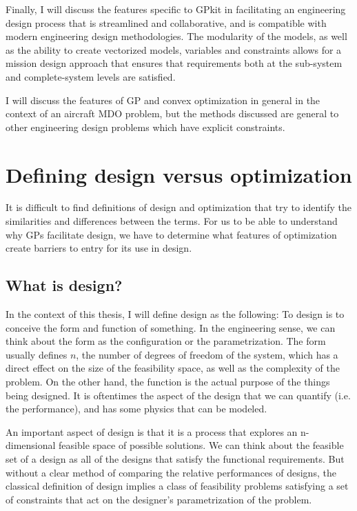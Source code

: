 Finally, I will discuss the features specific to GPkit in facilitating
an engineering design process that is streamlined and collaborative, and is
compatible with modern engineering design methodologies. The modularity of the
models, as well as the ability to create vectorized models, variables and constraints
allows for a mission design approach that ensures that
requirements both at the sub-system and complete-system levels are satisfied.

I will discuss the features of \gls{GP} and convex optimization in general in
the context of an aircraft \gls{MDO} problem, but the methods discussed
are general to other engineering design problems which have explicit constraints.

\section{Defining design versus optimization} \label{s:DesVsOpt}

It is difficult to find definitions of design and optimization that
try to identify the similarities and differences between the terms. For us to be
able to understand why \gls{GP}s facilitate design, we have to determine what
features of optimization create barriers to entry for its use in design.

\subsection{What is design?}

In the context of this thesis, I will define design as the following:
To design is to conceive the form and function of something.
In the engineering sense, we can think about the form as the configuration or
the parametrization. The form usually defines $n$, the number of degrees of freedom
of the system, which has a direct effect on the size of the feasibility
space, as well as the complexity of the problem.
On the other hand, the function is the actual purpose of the things
being designed. It is oftentimes the aspect of the design that we can
quantify (i.e. the performance), and has some physics that can be modeled.

An important aspect of design is that it is a process that explores an
n-dimensional feasible space of possible solutions.
We can think about the feasible set of a design as all of the designs
that satisfy the functional requirements. But without a clear method of comparing
the relative performances of designs, the classical
definition of design implies a class of feasibility problems satisfying a set of
constraints that act on the designer's parametrization of the problem.

